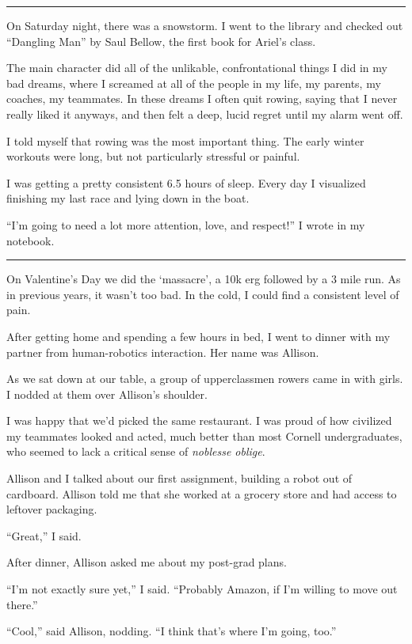 \plainfancybreak{12pt}{2}{}

On Saturday night, there was a snowstorm.  I went to the library and checked out
``Dangling Man'' by Saul Bellow, the first book for Ariel's class.

The main character did all of the unlikable, confrontational things I did in my
bad dreams, where I screamed at all of the people in my life, my parents, my
coaches, my teammates.  In these dreams I often quit rowing, saying that I never
really liked it anyways, and then felt a deep, lucid regret until my alarm
went off.

I told myself that rowing was the most important thing.  The early winter
workouts were long, but not particularly stressful or painful.

I was getting a pretty consistent 6.5 hours of sleep.  Every day I visualized
finishing my last race and lying down in the boat.

``I'm going to need a lot more attention, love, and respect!'' I wrote in my
notebook.

\plainfancybreak{12pt}{2}{}

On Valentine's Day we did the `massacre', a 10k erg followed by a 3 mile run.
As in previous years, it wasn't too bad.  In the cold, I could find a consistent
level of pain.

After getting home and spending a few hours in bed, I went to dinner with my
partner from human-robotics interaction.  Her name was Allison.

As we sat down at our table, a group of upperclassmen rowers came in with girls.
I nodded at them over Allison's shoulder.

I was happy that we'd picked the same restaurant.  I was proud of how civilized
my teammates looked and acted, much better than most Cornell undergraduates, who
seemed to lack a critical sense of \textit{noblesse oblige}.

Allison and I talked about our first assignment, building a robot out of
cardboard.  Allison told me that she worked at a grocery store and had access to
leftover packaging.

``Great,'' I said.

After dinner, Allison asked me about my post-grad plans.

``I'm not exactly sure yet,'' I said.  ``Probably Amazon, if I'm willing to move
out there.''

``Cool,'' said Allison, nodding.  ``I think that's where I'm going, too.''

